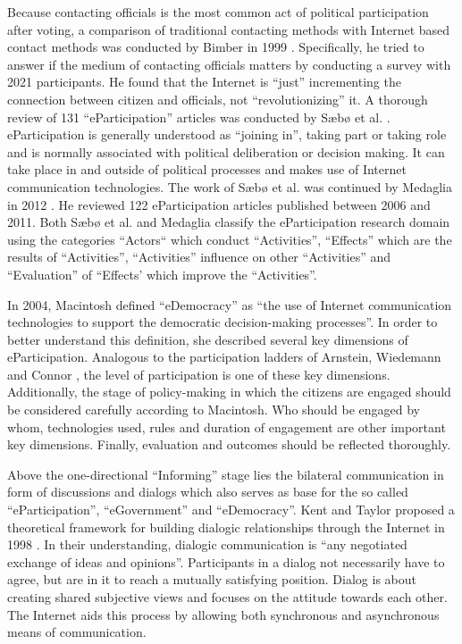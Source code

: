 Because contacting officials is the most common act of political participation after voting, a comparison of traditional contacting methods with Internet based contact methods was conducted by Bimber in 1999 \cite{Bimber1999_Citizen_communication_with_government}. Specifically, he tried to answer if the medium of contacting officials matters by conducting a survey with 2021 participants. He found that the Internet is ``just'' incrementing the connection between citizen and officials, not ``revolutionizing'' it.
A thorough review of 131 ``eParticipation'' articles was conducted by S{\ae}b{\o} et al. \cite{Saebo_eParticipation}. eParticipation is generally understood as ``joining in'', taking part or taking role and is normally associated with political deliberation or decision making. It can take place in and outside of political processes and makes use of Internet communication technologies. The work of S{\ae}b{\o} et al. was continued by Medaglia in 2012 \cite{Medaglia2012_eParticipation}. He reviewed 122 eParticipation articles published between 2006 and 2011. Both S{\ae}b{\o} et al. and Medaglia classify the eParticipation research domain using the categories ``Actors`` which conduct ``Activities'', ``Effects'' which are the results of ``Activities'', ``Activities'' influence on other ``Activities'' and ``Evaluation'' of ``Effects' which improve the ``Activities''.

In 2004, Macintosh \cite{Macintosh2004_eParticipation_characterization} defined ``eDemocracy'' as ``the use of Internet communication technologies to support the democratic decision-making processes''. In order to better understand this definition, she described several key dimensions of eParticipation. Analogous to the participation ladders of Arnstein, Wiedemann and Connor \cite{Arnstein1969_citizen_participation,Wiedemann1993355,Connor1988_new_ladder}, the level of participation is one of these key dimensions. Additionally, the stage of policy-making in which the citizens are engaged should be considered carefully according to Macintosh. Who should be engaged by whom, technologies used, rules and duration of engagement are other important key dimensions. Finally, evaluation and outcomes should be reflected thoroughly.

Above the one-directional ``Informing'' stage lies the bilateral communication in form of discussions and dialogs which also serves as base for the so called ``eParticipation'', ``eGovernment'' and ``eDemocracy''. Kent and Taylor proposed a theoretical framework for building dialogic relationships through the Internet in 1998 \cite{Kent1998_dialogic_relationships_through_www}. In their understanding, dialogic communication is ``any negotiated exchange of ideas and opinions''. Participants in a dialog not necessarily have to agree, but are in it to reach a mutually satisfying position. Dialog is about creating shared subjective views and focuses on the attitude towards each other. The Internet aids this process by allowing both synchronous and asynchronous means of communication.

